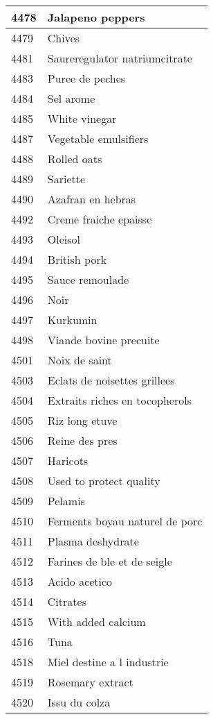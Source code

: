 \begin{longtable}{|l|l|}
4478 & Jalapeno peppers \\ \hline 
4479 & Chives \\ \hline 
4481 & Saureregulator natriumcitrate \\ \hline 
4483 & Puree de peches \\ \hline 
4484 & Sel arome \\ \hline 
4485 & White vinegar \\ \hline 
4487 & Vegetable emulsifiers \\ \hline 
4488 & Rolled oats \\ \hline 
4489 & Sariette \\ \hline 
4490 & Azafran en hebras \\ \hline 
4492 & Creme fraiche epaisse \\ \hline 
4493 & Oleisol \\ \hline 
4494 & British pork \\ \hline 
4495 & Sauce remoulade \\ \hline 
4496 & Noir \\ \hline 
4497 & Kurkumin \\ \hline 
4498 & Viande bovine precuite \\ \hline 
4501 & Noix de saint \\ \hline 
4503 & Eclats de noisettes grillees \\ \hline 
4504 & Extraits riches en tocopherols \\ \hline 
4505 & Riz long etuve \\ \hline 
4506 & Reine des pres \\ \hline 
4507 & Haricots \\ \hline 
4508 & Used to protect quality \\ \hline 
4509 & Pelamis \\ \hline 
4510 & Ferments boyau naturel de porc \\ \hline 
4511 & Plasma deshydrate \\ \hline 
4512 & Farines de ble et de seigle \\ \hline 
4513 & Acido acetico \\ \hline 
4514 & Citrates \\ \hline 
4515 & With added calcium \\ \hline 
4516 & Tuna \\ \hline 
4518 & Miel destine a l industrie \\ \hline 
4519 & Rosemary extract \\ \hline 
4520 & Issu du colza \\ \hline 

\end{longtable}
